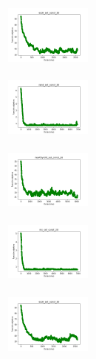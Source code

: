 \begin{figure}[H]
    \begin{subfigure}
        \centering
        \includegraphics[width=0.234\textwidth]{img/am01/ecoli_set_const_20_589741062_cost.png}
    \end{subfigure}
    \hfill
    \begin{subfigure}
        \centering
        \includegraphics[width=0.234\textwidth]{img/am01/rand_set_const_20_589741062_cost.png}
    \end{subfigure}
    \hfill
    \begin{subfigure}
        \centering
        \includegraphics[width=0.234\textwidth]{img/am01/newthyroid_set_const_20_589741062_cost.png}
    \end{subfigure}
    \hfill
    \begin{subfigure}
        \centering
        \includegraphics[width=0.234\textwidth]{img/am01/iris_set_const_20_277451237_cost.png}
    \end{subfigure}
    \hfill
    \begin{subfigure}
        \centering
        \includegraphics[width=0.234\textwidth]{img/am01/ecoli_set_const_20_277451237_cost.png}
    \end{subfigure}
    \hfill
    \begin{subfigure}
        \centering

\end{subfigure}
\end{figure}
